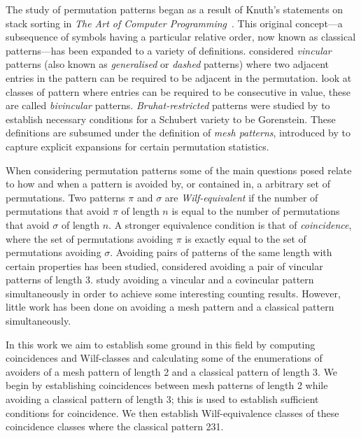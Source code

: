 The study of permutation patterns began as a result of Knuth's statements on
stack sorting in \emph{The Art of Computer Programming}~\cite[p.~243,
Ex.~5,6]{Knuth:1997:ACP:260999}. This original concept---a subsequence of
symbols having a particular relative order, now known as classical
patterns---has been expanded to a variety of definitions.
\textcite{babstein2000} considered \emph{vincular} patterns (also known as
\emph{generalised} or \emph{dashed} patterns) where two adjacent entries in the
pattern can be required to be adjacent in the permutation. \textcite{MR2652101}
look at classes of pattern where entries can be required to be consecutive in
value, these are called \emph{bivincular} patterns. \emph{Bruhat-restricted}
patterns were studied by \textcite{MR2264071} to establish necessary conditions
for a Schubert variety to be Gorenstein. These definitions are subsumed under
the definition of \emph{mesh patterns}, introduced by
\textcite{journals/combinatorics/BrandenC11} to capture explicit expansions for
certain permutation statistics.

When considering permutation patterns some of the main questions posed relate to
how and when a pattern is avoided by, or contained in, a arbitrary set of
permutations. Two patterns \(\pi\) and \(\sigma\) are \emph{Wilf-equivalent} if
the number of permutations that avoid \(\pi\) of length \(n\) is equal to the
number of permutations that avoid \(\sigma\) of length \(n\). A stronger
equivalence condition is that of \emph{coincidence}, where the set of
permutations avoiding \(\pi\) is exactly equal to the set of permutations
avoiding \(\sigma\). Avoiding pairs of patterns of the same length with certain
properties has been studied, \textcite{MR2178749} considered avoiding
a pair of vincular patterns of length 3. \textcite{2015arXiv151203226B} study
avoiding a vincular and a covincular pattern simultaneously in order to achieve
some interesting counting results. However, little work has been done on
avoiding a mesh pattern and a classical pattern simultaneously.

In this work we aim to establish some ground in this field by computing
coincidences and Wilf-classes and calculating some of the enumerations of
avoiders of a mesh pattern of length 2 and a classical pattern of length 3. We
begin by establishing coincidences between mesh patterns of length 2 while
avoiding a classical pattern of length 3; this is used to establish sufficient
conditions for coincidence. We then establish Wilf-equivalence classes of these
coincidence classes where the classical pattern 231.
